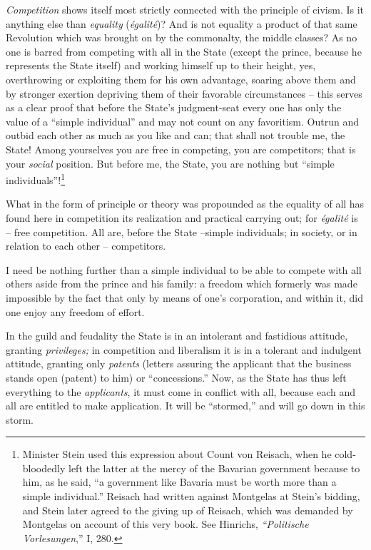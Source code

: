 \myhrule


\textit{Competition} shows itself most strictly connected with the principle 
of civism. Is it anything else than \textit{equality} (\textit{\'egalit\'e})? 
And is not equality a product of that same Revolution which was brought on by 
the commonalty, the middle classes? As no one is barred from competing with 
all in the State (except the prince, because he represents the State itself) 
and working himself up to their height, yes, overthrowing or exploiting them 
for his own advantage, soaring above them and by stronger exertion depriving 
them of their favorable circumstances -- this serves as a clear proof that 
before the State's judgment-seat every one has only the value of a ``simple 
individual'' and may not count on any favoritism. Outrun and outbid each 
other as much as you like and can; that shall not trouble me, the State! Among 
yourselves you are free in competing, you are competitors; that is your 
\textit{social} position. But before me, the State, you are nothing but 
``simple individuals''!\footnote{Minister Stein used this expression about 
Count von Reisach, when he cold-bloodedly left the latter at the mercy of the 
Bavarian government because to him, as he said, ``a government like Bavaria 
must be worth more than a simple individual.'' Reisach had written against 
Montgelas at Stein's bidding, and Stein later agreed to the giving up of 
Reisach, which was demanded by Montgelas on account of this very book. See 
Hinrichs, \textit{``Politische Vorlesungen},'' I, 280.}

What in the form of principle or theory was propounded as the equality of all 
has found here in competition its realization and practical carrying out; for 
\textit{\'egalit\'e} is -- free competition. All are, before the State 
--simple individuals; in society, or in relation to each other -- competitors.

I need be nothing further than a simple individual to be able to compete with 
all others aside from the prince and his family: a freedom which formerly was 
made impossible by the fact that only by means of one's corporation, and 
within it, did one enjoy any freedom of effort.

In the guild and feudality the State is in an intolerant and fastidious 
attitude, granting \textit{privileges;} in competition and liberalism it is in 
a tolerant and indulgent attitude, granting only \textit{patents} (letters 
assuring the applicant that the business stands open (patent) to him) or 
``concessions.'' Now, as the State has thus left everything to the 
\textit{applicants}, it must come in conflict with all, because each and all 
are entitled to make application. It will be ``stormed,'' and will go down 
in this storm.

